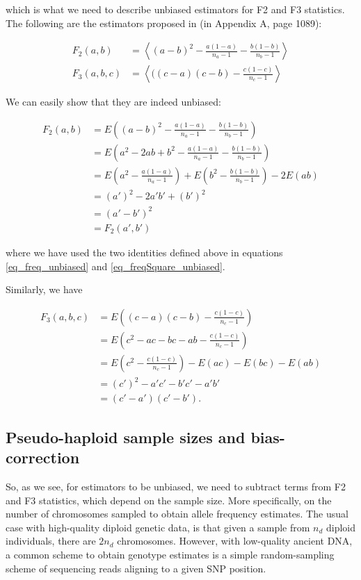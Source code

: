 \documentclass{article}
\begin{document}
which is what we need to describe unbiased estimators for F2 and F3 statistics. The following are the estimators proposed in \cite{Patterson2012-yq} (in Appendix A, page 1089):

\begin{align}
F_2(a,b) &= \left\langle (a-b)^2-\frac{a(1-a)}{n_a-1}-\frac{b(1-b)}{n_b-1}\right\rangle \\
F_3(a,b,c) &= \left\langle( (c-a)(c-b)-\frac{c(1-c)}{n_c-1}\right\rangle
\end{align}

We can easily show that they are indeed unbiased:

\begin{equation}
\begin{split}
F_2(a,b) &= E\left( (a-b)^2-\frac{a(1-a)}{n_a-1}-\frac{b(1-b)}{n_b-1}\right) \\
&= E\left( a^2-2a b+b^2-\frac{a(1-a)}{n_a-1}-\frac{b(1-b)}{n_b-1}\right)\\
&= E\left( a^2-\frac{a(1-a)}{n_a-1}\right) +E\left( b^2-\frac{b(1-b)}{n_b-1}\right) -2 E(a b) \\
&=(a')^2-2 a' b' +(b')^2\\
&=(a'-b')^2\\
&=F_2(a',b')
\end{split}
\end{equation}

where we have used the two identities defined above in equations \ref{eq_freq_unbiased} and \ref{eq_freqSquare_unbiased}.

Similarly, we have

\begin{equation}
\begin{split}
F_3(a,b,c) &= E\left( (c-a)(c-b)-\frac{c(1-c)}{n_c-1}\right) \\
&= E\left( c^2-a c- b c - a b-\frac{c(1-c)}{n_c-1}\right) \\
&= E\left( c^2-\frac{c(1-c)}{n_c-1}\right) -E(a c) -E(b c)  -E( a b) \\
&= (c')^2-a' c'-b'c'-a'b'\\
&= (c'-a')(c'-b').
\end{split}
\end{equation}

\subsection{Pseudo-haploid sample sizes and bias-correction}

So, as we see, for estimators to be unbiased, we need to subtract terms from F2 and F3 statistics, which depend on the sample size. More specifically, on the number of chromosomes sampled to obtain allele frequency estimates. The usual case with high-quality diploid genetic data, is that given a sample from \(n_d\) diploid individuals, there are \(2n_d\) chromosomes. However, with low-quality ancient DNA, a common scheme to obtain genotype estimates is a simple random-sampling scheme of sequencing reads aligning to a given SNP position.
\end{document}
